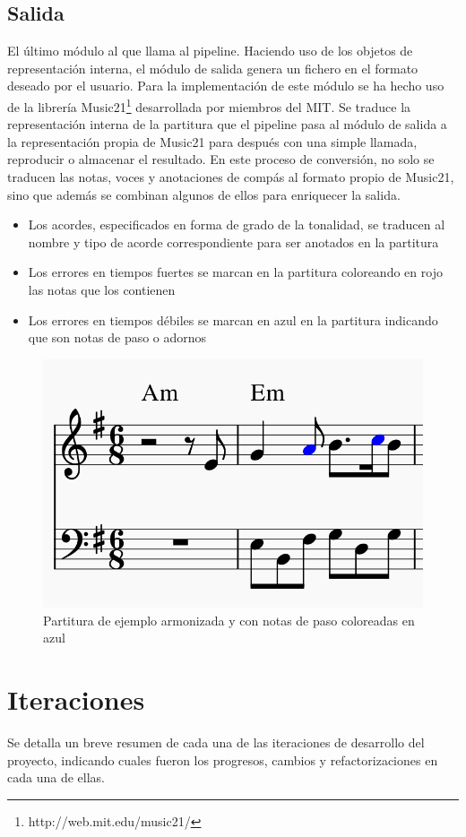 \subsection{Salida}
El último módulo al que llama al pipeline. Haciendo uso de los objetos de representación interna, el módulo de salida genera un fichero en el formato deseado por el usuario. 
Para la implementación de este módulo se ha hecho uso de la librería Music21\footnote{http://web.mit.edu/music21/} desarrollada por miembros del MIT. Se traduce la representación interna de la partitura que el pipeline pasa al módulo de salida a la representación propia de Music21 para después con una simple llamada, reproducir o almacenar el resultado.
En este proceso de conversión, no solo se traducen las notas, voces y anotaciones de compás al formato propio de Music21, sino que además se combinan algunos de ellos para enriquecer la salida.
\begin{itemize}
	\item Los acordes, especificados en forma de grado de la tonalidad, se traducen al nombre y tipo de acorde correspondiente para ser anotados en la partitura
	\item Los errores en tiempos fuertes se marcan en la partitura coloreando en rojo las notas que los contienen
	\item Los errores en tiempos débiles se marcan en azul en la partitura indicando que son notas de paso o adornos
\end{itemize}

\begin{figure}[h]
	\centering
	\includegraphics[width=0.6\linewidth]{imagenes/example_final_score.png}
	\caption{Partitura de ejemplo armonizada y con notas de paso coloreadas en azul}
	\label{fig:simple-piece-final}
\end{figure}


\section{Iteraciones}
Se detalla un breve resumen de cada una de las iteraciones de desarrollo del proyecto, indicando cuales fueron los progresos, cambios y refactorizaciones en cada una de ellas.

